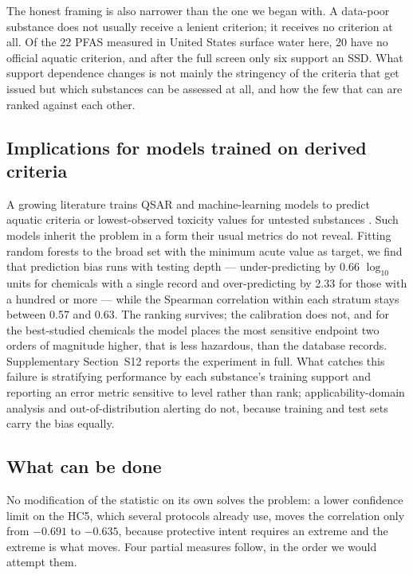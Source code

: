 \documentclass[preprint,12pt]{elsarticle}
\begin{document}
The honest framing is also narrower than the one we began with. A data-poor
substance does not usually receive a lenient criterion; it receives no criterion
at all. Of the 22 PFAS measured in United States surface water here, 20 have no
official aquatic criterion, and after the full screen only six support an SSD.
What support dependence changes is not mainly the stringency of the criteria
that get issued but which substances can be assessed at all, and how the few
that can are ranked against each other.

\subsection{Implications for models trained on derived criteria}

A growing literature trains QSAR and machine-learning models to predict aquatic
criteria or lowest-observed toxicity values for untested substances
\cite{khan2019ecotoxqsar, liang2025datagaps}. Such models
inherit the problem in a form their usual metrics do not reveal. Fitting random
forests to the broad set with the minimum acute value as target, we find that
prediction bias runs with testing depth --- under-predicting by 0.66
$\log_{10}$ units for chemicals with a single record and over-predicting by
2.33 for those with a hundred or more --- while the Spearman correlation within
each stratum stays between 0.57 and 0.63. The ranking survives; the calibration
does not, and for the best-studied chemicals the model places the most
sensitive endpoint two orders of magnitude higher, that is less hazardous, than
the database records. Supplementary Section~S12 reports the experiment in full.
What catches this failure is stratifying performance by each substance's
training support and reporting an error metric sensitive to level rather than
rank; applicability-domain analysis \cite{sahigara2012ad} and
out-of-distribution alerting \cite{kang2026openset} do not, because training
and test sets carry the bias equally.

\subsection{What can be done}

No modification of the statistic on its own solves the problem: a lower
confidence limit on the HC5, which several protocols already use, moves the
correlation only from $-0.691$ to $-0.635$, because protective intent requires
an extreme and the extreme is what moves. Four partial measures follow, in the
order we would attempt them.
\end{document}
